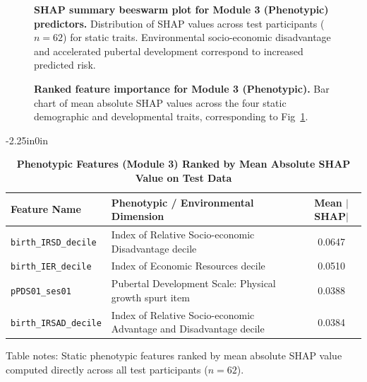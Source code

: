 \documentclass[10pt,letterpaper]{article}
\begin{document}
\begin{figure}[!h]
\caption{\textbf{SHAP summary beeswarm plot for Module 3 (Phenotypic) predictors.}
Distribution of SHAP values across test participants ($n=62$) for static traits. Environmental socio-economic disadvantage and accelerated pubertal development correspond to increased predicted risk.}
\label{fig:module3_shap_summary}
\end{figure}

\begin{figure}[!h]
\caption{\textbf{Ranked feature importance for Module 3 (Phenotypic).}
Bar chart of mean absolute SHAP values across the four static demographic and developmental traits, corresponding to Fig~\ref{fig:module3_shap_summary}.}
\label{fig:module3_bar}
\end{figure}

\begin{table}[!t]
\begin{adjustwidth}{-2.25in}{0in}
\centering
\caption{\textbf{Phenotypic Features (Module 3) Ranked by Mean Absolute SHAP Value on Test Data}}
\label{tab:module3_shap}
\footnotesize
\renewcommand{\arraystretch}{1.2}
\begin{tabular}{|l|l|c|}
\hline
\textbf{Feature Name} & \textbf{Phenotypic / Environmental Dimension} & \textbf{Mean $|$SHAP$|$} \\
\hline
\texttt{birth\_IRSD\_decile} & Index of Relative Socio-economic Disadvantage decile & 0.0647 \\
\hline
\texttt{birth\_IER\_decile} & Index of Economic Resources decile & 0.0510 \\
\hline
\texttt{pPDS01\_ses01} & Pubertal Development Scale: Physical growth spurt item & 0.0388 \\
\hline
\texttt{birth\_IRSAD\_decile} & Index of Relative Socio-economic Advantage and Disadvantage decile & 0.0384 \\
\hline
\end{tabular}
\begin{flushleft}
Table notes: Static phenotypic features ranked by mean absolute SHAP value computed directly across all test participants ($n=62$).
\end{flushleft}
\end{adjustwidth}
\end{table}
\end{document}
